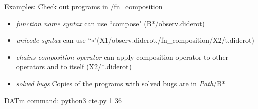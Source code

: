 {Examples}: Check out programs in {\exs{}/fn\_composition}
\vspace{-1em}
 \begin{itemize}[noitemsep]
\item \textit{function name syntax} can use ``compose" (B*/observ.diderot)
\item \textit{unicode syntax} can use ``$\circ$"(X1/observ.diderot,\exs{}/fn\_composition/X2/t.diderot)
\item \textit{chains composition operator}  can apply composition operator to other operators and to itself (X2/*.diderot)
\item \textit{solved bugs} Copies of the programs with solved bugs are in \textit{Path}/B*
 \end{itemize}
 \vspace{-1em}
DATm command: python3 cte.py 1  36
